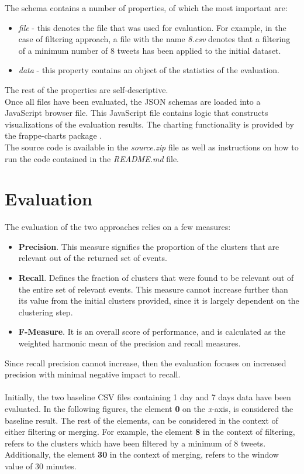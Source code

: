 \documentclass[a4paper,portrait,12pt]{article}
\begin{document}
The schema contains a number of properties, of which the most important are:
\begin{itemize}
	\item \textit{file} - this denotes the file that was used for evaluation.
	      For example, in the case of filtering approach, a file with the name \textit{8.csv} denotes that a filtering of a minimum number of 8 tweets has been applied to the initial dataset.
	\item \textit{data} - this property contains an object of the statistics of the evaluation.
\end{itemize}

The rest of the properties are self-descriptive.\\

Once all files have been evaluated, the JSON schemas are loaded into a JavaScript browser file.
This JavaScript file contains logic that constructs visualizations of the evaluation results.
The charting functionality is provided by the frappe-charts package \cite{frappeCharts}.\\

The source code is available in the \textit{source.zip} file as well as instructions on how to run the code contained in the \textit{README.md} file.

\section{Evaluation}
\label{section-eval}

The evaluation of the two approaches relies on a few measures:
\begin{itemize}
	\item \textbf{Precision}.
	      This measure signifies the proportion of the clusters that are relevant out of the returned set of events.
	\item \textbf{Recall}.
	      Defines the fraction of clusters that were found to be relevant out of the entire set of relevant events.
	      This measure cannot increase further than its value from the initial clusters provided, since it is largely dependent on the clustering step.
	\item \textbf{F-Measure}.
	      It is an overall score of performance, and is calculated as the weighted harmonic mean of the precision and recall measures.
\end{itemize}

Since recall precision cannot increase, then the evaluation focuses on increased precision with minimal negative impact to recall.\\
\\
Initially, the two baseline CSV files containing 1 day and 7 days data have been evaluated.
In the following figures, the element \textbf{0} on the \textit{x}-axis, is considered the baseline result.
The rest of the elements, can be considered in the context of either filtering or merging.
For example, the element \textbf{8} in the context of filtering, refers to the clusters which have been filtered by a minimum of 8 tweets.
Additionally, the element \textbf{30} in the context of merging, refers to the window value of 30 minutes.
\end{document}
